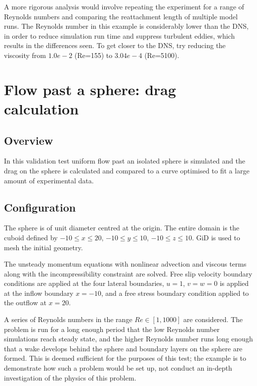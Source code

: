 A more rigorous analysis would involve repeating the experiment for a range of
Reynolds numbers and comparing the reattachment length of multiple model runs.
The Reynolds number in this example is considerably lower than the DNS, 
in order to reduce simulation run time and suppress turbulent eddies, which
results in the differences seen. To get closer to the DNS, try reducing the
viscosity from $1.0e-2$ (Re=155) to $3.04e-4$ (Re=5100).


\section{Flow past a sphere: drag calculation}
\label{sec:flow_past_sphere}
\subsection{Overview}
In this validation test uniform flow past an isolated sphere is simulated
and the drag on the sphere is calculated and compared to a curve optimised
to fit a large amount of experimental data.

\subsection{Configuration}
The sphere is of unit diameter centred at the origin. The entire domain is
the cuboid defined by $-10\le x\le 20$, $-10\le y\le 10$, $-10\le z\le 10$.
GiD is used to mesh the initial geometry.

The unsteady momentum equations with nonlinear advection and viscous terms
along with the incompressibility constraint are solved. Free slip velocity
boundary conditions are applied at the four lateral boundaries, $u=1$, $v=w=0$ is
applied at the inflow boundary $x=-10$, and a free stress boundary condition
applied to the outflow at $x=20$. 

A series of Reynolds numbers in the range
$Re\in [1,1000]$ are considered. The problem is run for a long enough
period that the low Reynolds number simulations reach steady state, and the
higher Reynolds number runs long enough that a wake develops behind the
sphere and boundary layers on the sphere are formed.  This is deemed
sufficient for the purposes of this test; the example is to demonstrate
how such a problem would be set up, not conduct an in-depth 
investigation of the physics of this problem.

